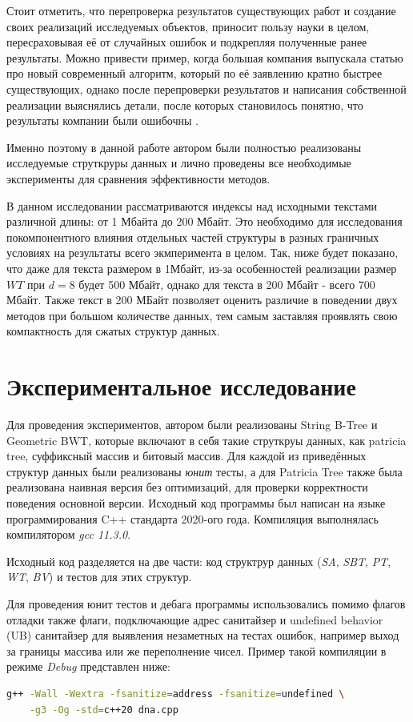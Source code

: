 \documentclass[a4paper,12pt]{article}
\begin{document}
Стоит отметить, что перепроверка результатов существующих работ и создание своих реализаций исследуемых объектов, приносит пользу науки в целом, пересраховывая её от случайных ошибок и подкрепляя полученные ранее результаты. Можно привести пример, когда большая компания выпускала статью про новый современный алгоритм, который по её заявлению кратно быстрее существующих, однако после перепроверки результатов и написания собственной реализации выяснялись детали, после которых становилось понятно, что результаты компании были ошибочны \cite{wang2018building}.

Именно поэтому в данной работе автором были полностью реализованы исследуемые струткруры данных и лично проведены все необходимые эксперименты для сравнения эффективности методов.

В данном исследовании рассматриваются индексы над исходными текстами различной длины: от 1 Мбайта до 200 Мбайт. Это необходимо для исследования покомпонентного влияния отдельных частей структуры в разных граничных условиях на результаты всего экмперимента в целом. Так, ниже будет показано, что даже для текста размером в 1Мбайт, из-за особенностей реализации размер $WT$ при $d = 8$ будет 500 Мбайт, однако для текста в 200 Мбайт - всего 700 Мбайт. Также текст в 200 МБайт позволяет оценить различие в поведении двух методов при большом количестве данных, тем самым заставляя проявлять свою компактность для сжатых структур данных.

\section{Экспериментальное исследование}
Для проведения экспериментов, автором были реализованы String B-Tree и Geometric BWT, которые включают в себя такие струткруы данных, как patricia tree, суффиксный массив и битовый массив. Для каждой из приведённых структур данных были реализованы \textit{юнит} тесты, а для Patricia Tree также была реализована наивная версия без оптимизаций, для проверки корректности поведения основной версии. Исходный код программы был написан на языке программирования C++\cite{вандервуд2003шаблоны} стандарта 2020-ого года. Компиляция выполнялась компилятором \textit{gcc 11.3.0}.

Исходный код разделяется на две части: код структрур данных (\textit{SA}, \textit{SBT}, \textit{PT}, \textit{WT}, \textit{BV}) и тестов для этих структур.

Для проведения юнит тестов и дебага программы использовались помимо флагов отладки также флаги, подключающие адрес санитайзер и undefined behavior (UB) санитайзер для выявления незаметных на тестах ошибок, например выход за границы массива или же переполнение чисел. Пример такой компиляции в режиме \textit{Debug} представлен ниже:
\begin{lstlisting}[language=bash]
g++ -Wall -Wextra -fsanitize=address -fsanitize=undefined \
    -g3 -Og -std=c++20 dna.cpp
\end{lstlisting}
\end{document}
